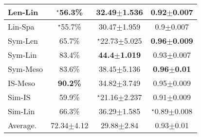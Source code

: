 \begin{table*}
\begin{subtable}[t]{0.48\textwidth}
\begin{tabular}{|l|ccc|}
Len-Lin    & $^{\star}${56.3\%}              & 32.49$\pm$1.536                & 0.92$\pm$0.007             \\ \hline
Lin-Spa    & $^{\star}${55.7\%}              & 30.47$\pm$1.959                & 0.9$\pm$0.007              \\ \hline
Sym-Len    & 65.7\%                          & $^{\star}${22.73$\pm$5.025}    & \textbf{0.96$\pm$0.009}    \\ \hline
Sym-Lin    & 83.4\%                          & \textbf{44.4$\pm$1.019}        & 0.93$\pm$0.007             \\ \hline
Sym-Meso   & 83.6\%                          & 38.45$\pm$5.136                & \textbf{0.96$\pm$0.01}     \\ \hline
IS-Meso    & \textbf{90.2\%}                 & 34.82$\pm$3.749                & 0.95$\pm$0.009             \\ \hline
Sim-IS     & 59.9\%                          & $^{\star}${21.16$\pm$2.237}    & 0.91$\pm$0.009             \\ \hline
Sim-Lin    & 66.3\%                          & 36.29$\pm$1.585                & $^{\star}${0.89$\pm$0.008} \\ \hline
Average.   & 72.34$\pm$4.12                  & 29.88$\pm$2.84                 & 0.93$\pm$0.01           
\\\hline
\end{tabular}%
\label{tab:table1_d}
\end{subtable}%



\label{tab:resultsTable}
\end{table*}